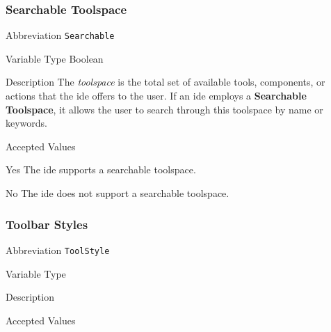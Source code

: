 \subsubsection{Searchable Toolspace}
\label{subsubsec:searchable}

\begin{AlignedDesc}
  \item[Abbreviation] \texttt{Searchable}

  \item[Variable Type] Boolean

  \item[Description] The \textit{toolspace} is the total set of available
  tools, components, or actions that the \ac{ide} offers to the user. If an
  \ac{ide} employs a \textbf{Searchable Toolspace}, it allows the user to
  search through this toolspace by name or keywords.

  \item[Accepted Values]

  \begin{AlignedDesc}
    \item[Yes] The \ac{ide} supports a searchable toolspace.
    \item[No] The \ac{ide} does not support a searchable toolspace.
  \end{AlignedDesc}

\end{AlignedDesc}

\subsubsection{Toolbar Styles}
\label{subsubsec:toolstyle}

\begin{AlignedDesc}
  \item[Abbreviation] \texttt{ToolStyle}

  \item[Variable Type]

  \item[Description]

  \item[Accepted Values]

  \begin{AlignedDesc}
    \item[\textellipsis]
  \end{AlignedDesc}

\end{AlignedDesc}

